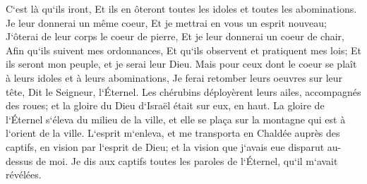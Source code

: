 \verse C`est là qu`ils iront, Et ils en ôteront toutes les idoles et toutes les abominations. 
\verse Je leur donnerai un même coeur, Et je mettrai en vous un esprit nouveau; J`ôterai de leur corps le coeur de pierre, Et je leur donnerai un coeur de chair, 
\verse Afin qu`ils suivent mes ordonnances, Et qu`ils observent et pratiquent mes lois; Et ils seront mon peuple, et je serai leur Dieu. 
\verse Mais pour ceux dont le coeur se plaît à leurs idoles et à leurs abominations, Je ferai retomber leurs oeuvres sur leur tête, Dit le Seigneur, l`Éternel. 
\verse Les chérubins déployèrent leurs ailes, accompagnés des roues; et la gloire du Dieu d`Israël était sur eux, en haut. 
\verse La gloire de l`Éternel s`éleva du milieu de la ville, et elle se plaça sur la montagne qui est à l`orient de la ville. 
\verse L`esprit m`enleva, et me transporta en Chaldée auprès des captifs, en vision par l`esprit de Dieu; et la vision que j`avais eue disparut au-dessus de moi. 
\verse Je dis aux captifs toutes les paroles de l`Éternel, qu`il m`avait révélées. 

\chapter{}

